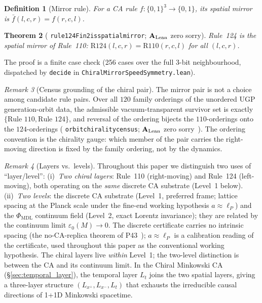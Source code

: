\documentclass[11pt]{article}
\newtheorem{theorem}{Theorem}[section]
\newtheorem{definition}[theorem]{Definition}
\theoremstyle{remark}
\newtheorem{remark}[theorem]{Remark}
\newcommand{\PHIMDL}{\Phi_{\mathrm{MDL}}}
\newcommand{\lean}[1]{%
  \penalty-100
  \begingroup\def\_{\textunderscore\allowbreak}\texttt{#1}\endgroup}
\newcommand{\epsz}{\varepsilon_0}
\newcommand{\CatAL}{\ensuremath{\textbf{A}_{\rm Lean}}}
\begin{document}
\begin{definition}[Mirror rule]
  \label{def:mirror}
  For a CA rule $f:\{0,1\}^3\to\{0,1\}$, its \emph{spatial mirror} is
  $\bar f(l,c,r)=f(r,c,l)$.
\end{definition}

\begin{theorem}[\lean{rule124Fin2\_is\_spatial\_mirror}; \CatAL{} zero sorry]
  \label{thm:mirror}
  Rule~124 is the spatial mirror of Rule~110:
  $\mathrm{R124}(l,c,r)=\mathrm{R110}(r,c,l)$ for all $(l,c,r)$.
\end{theorem}

\noindent The proof is a finite case check (256 cases over the full
3-bit neighbourhood, dispatched by \lean{decide} in
\lean{ChiralMirrorSpeedSymmetry.lean}).

\begin{remark}[Census grounding of the chiral pair]
\label{rem:census}
The mirror pair is not a choice among candidate rule pairs.  Over all $120$
family orderings of the unordered UGP generation-orbit data, the admissible
vacuum-transparent survivor set is exactly
$\{\text{Rule~110}, \text{Rule~124}\}$, and reversal of the ordering bijects
the $110$-orderings onto the $124$-orderings
(\lean{orbit\_chirality\_census}; \CatAL{} zero
sorry~\cite{SpivackGTEPolynomialWolfram,SpivackGTECompleteFramework}).
The ordering convention is the chirality gauge: which member of the pair
carries the right-moving direction is fixed by the family ordering, not by
the dynamics.
\end{remark}

\begin{remark}[Layers vs.\ levels]
\label{rem:layers_levels}
Throughout this paper we distinguish two uses of ``layer/level'':
(i)~\emph{Two chiral layers}: Rule~110 (right-moving) and Rule~124 (left-moving), both operating on the \emph{same} discrete CA substrate (Level~1 below).
(ii)~\emph{Two levels}: the discrete CA substrate (Level~1, preferred frame; lattice spacing at the Planck scale under the fine-end working hypothesis $a\approx\ell_P$) and the $\PHIMDL$ continuum field (Level~2, exact Lorentz invariance); they are related by the continuum limit $\epsz(M)\to0$.
The discrete certificate carries no intrinsic spacing (the no-CA-replica theorem of P43~\cite{SpivackCompleteness}); $a\approx\ell_P$ is a calibration reading of the certificate, used throughout this paper as the conventional working hypothesis.
The chiral layers live \emph{within} Level~1; the two-level distinction is between the CA and its continuum limit.
In the Chiral Minkowski CA (\S\ref{sec:temporal_layer}), the temporal layer $L_t$ joins the two spatial layers, giving a three-layer structure $(L_{x^+}, L_{x^-}, L_t)$ that exhausts the irreducible causal directions of 1+1D Minkowski spacetime.
\end{remark}
\end{document}
